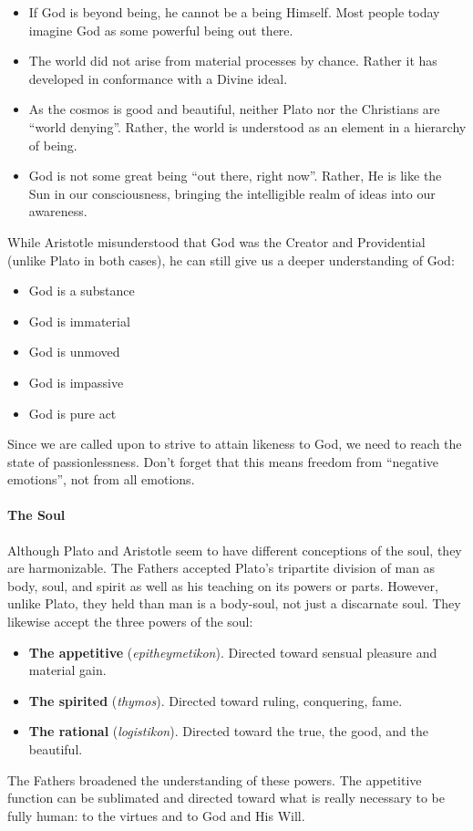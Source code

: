 \begin{itemize}
\item If God is beyond being, he cannot be a being Himself. Most people today imagine God as some powerful being out there. 
\item The world did not arise from material processes by chance. Rather it has developed in conformance with a Divine ideal. 
\item As the cosmos is good and beautiful, neither Plato nor the Christians are “world denying”. Rather, the world is understood as an element in a hierarchy of being. 
\item God is not some great being “out there, right now”. Rather, He is like the Sun in our consciousness, bringing the intelligible realm of ideas into our awareness. 
\end{itemize}
While Aristotle misunderstood that God was the Creator and Providential (unlike Plato in both cases), he can still give us a deeper understanding of God:

\begin{itemize}
\item God is a substance 
\item God is immaterial 
\item God is unmoved 
\item God is impassive 
\item God is pure act 
\end{itemize}
Since we are called upon to strive to attain likeness to God, we need to reach the state of passionlessness. Don't forget that this means freedom from “negative emotions”, not from all emotions.

\paragraph{The Soul}
Although Plato and Aristotle seem to have different conceptions of the soul, they are harmonizable. The Fathers accepted Plato's tripartite division of man as body, soul, and spirit as well as his teaching on its powers or parts. However, unlike Plato, they held than man is a body-soul, not just a discarnate soul. They likewise accept the three powers of the soul:

\begin{itemize}
\item \textbf{The appetitive} (\emph{epitheymetikon}). Directed toward sensual pleasure and material gain. 
\item \textbf{The spirited} (\emph{thymos}). Directed toward ruling, conquering, fame. 
\item \textbf{The rational} (\emph{logistikon}). Directed toward the true, the good, and the beautiful. 
\end{itemize}
The Fathers broadened the understanding of these powers. The appetitive function can be sublimated and directed toward what is really necessary to be fully human: to the virtues and to God and His Will.

